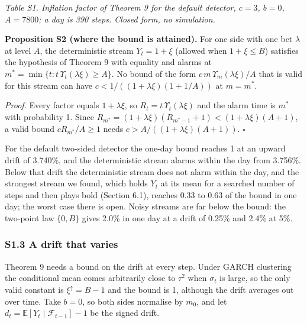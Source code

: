 \documentclass[
]{article}
\begin{document}
\emph{Table S1. Inflation factor of Theorem 9 for the default detector,
\(c = 3\), \(b = 0\), \(A = 7800\); a day is 390 steps. Closed form, no
simulation.}

\textbf{Proposition S2 (where the bound is attained).} For one side with
one bet \(\lambda\) at level \(A\), the deterministic stream
\(Y_t = 1 + \xi\) (allowed when \(1 + \xi \le B\)) satisfies the
hypothesis of Theorem 9 with equality and alarms at
\(m^\ast = \min\lbrace t : t\,\Upsilon_t(\lambda\xi) \ge A\rbrace\). No
bound of the form \(c\,m\,\Upsilon_m(\lambda\xi)/A\) that is valid for
this stream can have \(c < 1/((1 + \lambda\xi)(1 + 1/A))\) at
\(m = m^\ast\).

\emph{Proof.} Every factor equals \(1 + \lambda\xi\), so
\(R_t = t\,\Upsilon_t(\lambda\xi)\) and the alarm time is \(m^\ast\)
with probability 1. Since
\(R_{m^\ast} = (1 + \lambda\xi)(R_{m^\ast - 1} + 1) < (1 + \lambda\xi)(A + 1)\),
a valid bound \(c R_{m^\ast}/A \ge 1\) needs
\(c > A/((1 + \lambda\xi)(A + 1))\). \(\square\)

For the default two-sided detector the one-day bound reaches 1 at an
upward drift of 3.740\%, and the deterministic stream alarms within the
day from 3.756\%. Below that drift the deterministic stream does not
alarm within the day, and the strongest stream we found, which holds
\(Y_t\) at its mean for a searched number of steps and then plays bold
(Section 6.1), reaches 0.33 to 0.63 of the bound in one day; the worst
case there is open. Noisy streams are far below the bound: the two-point
law \(\lbrace 0, B\rbrace\) gives 2.0\% in one day at a drift of 0.25\%
and 2.4\% at 5\%.

\hypertarget{s1.3-a-drift-that-varies}{%
\subsubsection{S1.3 A drift that
varies}\label{s1.3-a-drift-that-varies}}

Theorem 9 needs a bound on the drift at every step. Under GARCH
clustering the conditional mean comes arbitrarily close to \(\tau^2\)
when \(\sigma_t\) is large, so the only valid constant is
\(\xi^{\uparrow} = B - 1\) and the bound is 1, although the drift
averages out over time. Take \(b = 0\), so both sides normalise by
\(m_0\), and let \(d_t = \mathbb{E}[Y_t \mid \mathcal{F}_{t-1}] - 1\) be
the signed drift.
\end{document}
